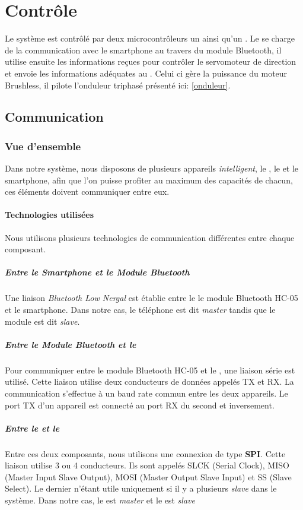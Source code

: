 	\chapter{Contrôle}
	Le système est contrôlé par deux microcontrôleurs un \pic ainsi qu'un \dspic. Le \pic se charge de la communication avec le smartphone au travers du module Bluetooth, il utilise ensuite les informations reçues pour contrôler le servomoteur de direction et envoie les informations adéquates au \dspic. Celui ci gère la puissance du moteur Brushless, il pilote l'onduleur triphasé présenté ici: \ref{onduleur}.%
		\section{Communication}
			\subsection{Vue d'ensemble}
				Dans notre système, nous disposons de plusieurs appareils \textit{intelligent}, le \pic , le \dspic et le smartphone, afin que l'on puisse profiter au maximum des capacités de chacun, ces éléments doivent communiquer entre eux.
				\subsubsection{Technologies utilisées}
				Nous utilisons plusieurs technologies de communication différentes entre chaque composant.
				\paragraph{Entre le \textit{Smartphone} et le \textit{Module Bluetooth}} Une liaison \textit{Bluetooth Low Nergal} est établie entre le le module Bluetooth HC-05 et le smartphone. Dans notre cas, le téléphone est dit \textit{master} tandis que le module est dit \textit{slave}.
				\paragraph{Entre le \textit{Module Bluetooth} et le \textit{\pic} } Pour communiquer entre le module Bluetooth HC-05 et le \pic, une liaison série est utilisé. Cette liaison utilise deux conducteurs de données appelés TX et RX. La communication s'effectue à un baud rate commun entre les deux appareils. Le port TX d'un appareil est connecté au port RX du second et inversement.
				\paragraph{Entre le \textit{\dspic} et le \textit{\pic}} Entre ces deux composants, nous utilisons une connexion de type \textbf{SPI}. Cette liaison utilise 3 ou 4 conducteurs. Ils sont appelés SLCK (\textsf{Serial Clock}), MISO (\textsf{Master Input Slave Output}), MOSI (\textsf{Master Output Slave Input})  et SS (\textsf{Slave Select}). Le dernier n'étant utile uniquement si il y a plusieurs \textit{slave} dans le système. Dans notre cas, le \pic est \textit{master} et le \dspic est \textit{slave}
				
